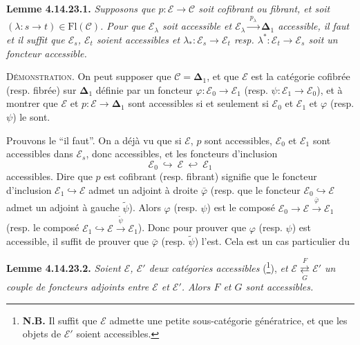 \documentclass[11pt]{article}
\newcommand{\msp}[1]{\marginpar{\footnotesize [#1]}}
\newcommand{\bDelta}{\boldsymbol{\Delta}}
\newcommand{\Fl}{\mathrm{Fl}}
\begin{document}
\textbf{Lemme 4.14.23.1.} \textit{Supposons que $p:\mathcal{E}\longrightarrow\mathcal{C}$ soit cofibrant ou fibrant, et soit $(\lambda:s\longrightarrow t)\in\Fl(\mathcal{C})$. Pour que $\mathcal{E}_\lambda$ soit accessible et $\mathcal{E}_\lambda\xrightarrow{\;p_\lambda\;}\bDelta_1$ accessible, il faut et il suffit que $\mathcal{E}_s$, $\mathcal{E}_t$ soient accessibles et $\lambda_*:\mathcal{E}_s\longrightarrow\mathcal{E}_t$ resp. $\lambda^*:\mathcal{E}_t\longrightarrow\mathcal{E}_s$ soit un foncteur accessible.}

\textsc{Démonstration.} On peut supposer que $\mathcal{C}=\bDelta_1$, et que $\mathcal{E}$ est la catégorie cofibrée (resp. fibrée) sur $\bDelta_1$ définie par un foncteur $\varphi:\mathcal{E}_0\longrightarrow\mathcal{E}_1$ (resp. $\psi:\mathcal{E}_1\longrightarrow\mathcal{E}_0$), et à montrer que $\mathcal{E}$ et $p:\mathcal{E}\longrightarrow\bDelta_1$ sont accessibles si et seulement si $\mathcal{E}_0$ et $\mathcal{E}_1$ et $\varphi$ (resp. $\psi$) le sont.

\msp{page 411}

Prouvons le “il faut”. On a déjà vu que si $\mathcal{E}$, $p$ sont accessibles, $\mathcal{E}_0$ et $\mathcal{E}_1$ sont accessibles dans $\mathcal{E}_s$, donc accessibles, et les foncteurs d'inclusion %
\[
\mathcal{E}_0\ \hookrightarrow\ \mathcal{E}\ \hookleftarrow\ \mathcal{E}_1
\]
accessibles. Dire que $p$ est cofibrant (resp. fibrant) signifie que le foncteur d'inclusion $\mathcal{E}_1\hookrightarrow\mathcal{E}$ admet un adjoint à droite $\bar{\varphi}$ (resp. que le foncteur $\mathcal{E}_0\hookrightarrow\mathcal{E}$ admet un adjoint à gauche $\tilde{\psi}$). Alors $\varphi$ (resp. $\psi$) est le composé $\mathcal{E}_0\longrightarrow\mathcal{E}\xrightarrow{\;\bar{\varphi}\;}\mathcal{E}_1$ (resp. le composé $\mathcal{E}_1\hookrightarrow\mathcal{E}\xrightarrow{\;\tilde{\psi}\;}\mathcal{E}_1$). Donc pour prouver que $\varphi$ (resp. $\psi$) est accessible, il suffit de prouver que $\bar{\varphi}$ (resp. $\tilde{\psi}$) l'est. Cela est un cas particulier du %

\textbf{Lemme 4.14.23.2.} \textit{Soient $\mathcal{E}$, $\mathcal{E}'$ deux catégories accessibles} (\footnote[172]{\textbf{N.B.} Il suffit que $\mathcal{E}$ admette une petite sous-catégorie génératrice, et que les objets de $\mathcal{E}'$ soient accessibles.}), \textit{et $\mathcal{E}\underset{G}{\overset{F}{\rightleftarrows}}\mathcal{E}'$ un couple de foncteurs adjoints entre $\mathcal{E}$ et $\mathcal{E}'$. Alors $F$ et $G$ sont accessibles.}
\end{document}
